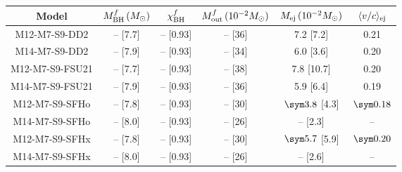 \begin{tabular}{c cc ccc}
	\toprule \toprule
	Model & $M_{\rm BH}^f\,(M_\odot)$ & $\chi_{\rm BH}^f$ & $M_{\rm out}^f\,(10^{-2} M_\odot)$ & $M_{\rm ej}\,(10^{-2} M_\odot)$ & $\langle v/c \rangle_{\rm ej}$\\
	\midrule
	M12-M7-S9-DD2 & -- [7.7] & -- [0.93] & -- [36] & 7.2 [7.2] & 0.21\\
	M14-M7-S9-DD2 & -- [7.9] & -- [0.93] & -- [34] & 6.0 [3.6] & 0.20\\
	M12-M7-S9-FSU21 & -- [7.7] & -- [0.93] & -- [38] & 7.8 [10.7] & 0.20\\
	M14-M7-S9-FSU21 & -- [7.9] & -- [0.93] & -- [36] & 5.9 [6.4] & 0.19\\
	M12-M7-S9-SFHo & -- [7.8] & -- [0.93] & -- [30] & $\sym 3.8$ [4.3] & $\sym 0.18$\\
	M14-M7-S9-SFHo & -- [8.0] & -- [0.93] & -- [26] & -- [2.3] & --\\
	M12-M7-S9-SFHx & -- [7.8] & -- [0.93] & -- [30] & $\sym 5.7$ [5.9] & $\sym0.20 $\\
	M14-M7-S9-SFHx & -- [8.0] & -- [0.93] & -- [26] & -- [2.6] & --\\
	\bottomrule \bottomrule
\end{tabular}